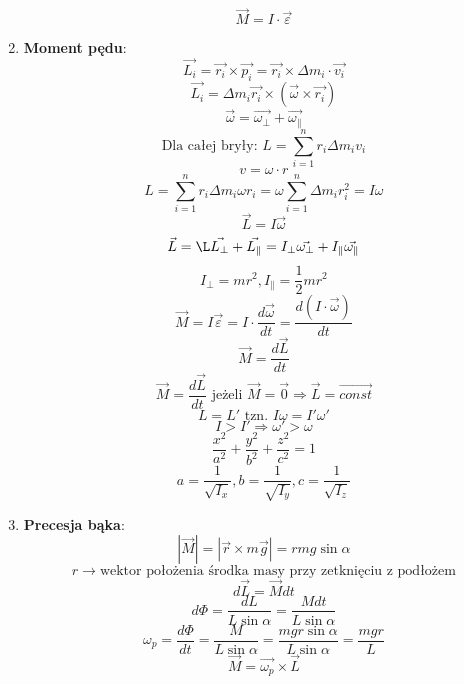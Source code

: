 \documentclass{article}
\begin{document}
\begin{enumerate}
\[		\]
		\[
		\vec{M} = I \cdot \vec{\varepsilon}
		\]
		\item \textbf{Moment pędu}:
		\[
		\vec{L_i} = \vec{r_i} \times \vec{p_i} = \vec{r_i} \times \Delta m_i \cdot \vec{v_i}
		\]
		\[
		\vec{L_i} = \Delta m_i \vec{r_i} \times (\vec{\omega} \times \vec{r_i})
		\]
		\[
		\vec{\omega} = \vec{\omega_{\perp}} + \vec{\omega_{\parallel}}
		\]
		\[
		\text{Dla całej bryły: }
		L = \sum\limits_{i = 1}^n r_i \Delta m_i v_i
		\]
		\[
		v = \omega \cdot r
		\]
		\[
		L = \sum\limits_{i = 1}^n r_i \Delta m_i \omega r_i = \omega \sum\limits_{i = 1}^n \Delta m_i r_i^2 = I \omega
		\]
		\[
		\vec{L} = I \vec{\omega}
		\]
		\[
		\vec{L} = \L\vec{L_{\perp}} + \vec{L_{\parallel}} = I_{\perp} \vec{\omega_{\perp}} + I_{\parallel} \vec{\omega_{\parallel}}
		\]
		\[
		I_{\perp} = mr^2, I_{\parallel} = \frac{1}{2} mr^2
		\]
		\[
		\vec{M} = I \vec{\varepsilon} = I \cdot \frac{d \vec{\omega}}{dt} = \frac{d(I \cdot \vec{\omega})}{dt}
		\]
		\[
		\vec{M} = \frac{d \vec{L}}{dt}
		\]
		\[
		\vec{M} = \frac{d \vec{L}}{dt} \text{ jeżeli } \vec{M} = \vec{0} \Rightarrow \vec{L} = \overrightarrow{const}
		\]
		\[
		L = L' \text{ tzn. } I \omega = I' \omega '
		\]
		\[
		I > I' \Rightarrow \omega ' > \omega
		\]
		\[
		\frac{x^2}{a^2} + \frac{y^2}{b^2} + \frac{z^2}{c^2} = 1
		\]
		\[
		a = \frac{1}{\sqrt{I_x}}, b = \frac{1}{\sqrt{I_y}}, c = \frac{1}{\sqrt{I_z}}
		\]
		\item \textbf{Precesja bąka}:
		\[
		| \vec{M} | = | \vec{r} \times m \vec{g} | = rmg \sin \alpha
		\]
		\[
		r \longrightarrow \text{wektor położenia środka masy przy zetknięciu z podłożem}
		\]
		\[
		d \vec{L} = \vec{M} dt
		\]
		\[
		d \varPhi = \frac{dL}{L \sin\alpha} = \frac{Mdt}{L \sin \alpha}
		\]
		\[
		\omega_p = \frac{d \varPhi}{dt} = \frac{M}{L \sin \alpha} = \frac{mgr \sin \alpha}{L \sin \alpha} = \frac{mgr}{L}
		\]
		\[
		\vec{M} = \vec{\omega_p} \times \vec{L}
		\]
		
	\end{enumerate}
	
\end{document}
